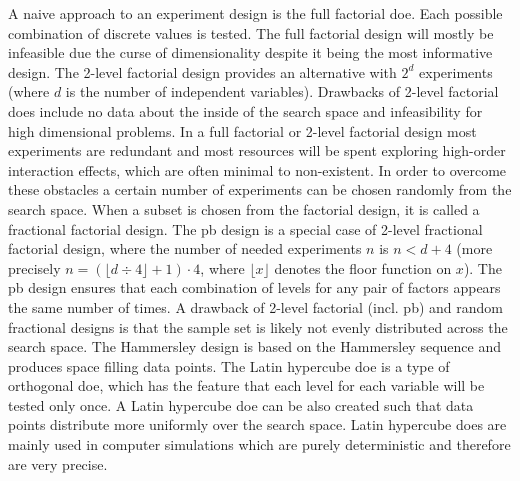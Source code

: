 A naive approach to an experiment design is the full factorial \gls{doe}.
Each possible combination of discrete values is tested.
The full factorial design will mostly be infeasible due the curse of dimensionality\cite{cherkassky1998learning} despite it being the most informative design.
The 2-level factorial design provides an alternative with $2^d$ experiments (where $d$ is the number of independent variables). 
Drawbacks of 2-level factorial \gls{doe}s include no data about the inside of the search space and infeasibility for high dimensional problems.
In a full factorial or 2-level factorial design most experiments are redundant and most resources will be spent exploring high-order interaction effects\cite{gunst2009fractional}, which are often minimal to non-existent.
In order to overcome these obstacles a certain number of experiments can be chosen randomly from the search space. 
When a subset is chosen from the factorial design, it is called a fractional factorial design. 
The \gls{pb}\cite{vanaja2007design,miller2001using,wang1995hidden} design is a special case of 2-level fractional factorial design, 
where the number of needed experiments $n$ is $n<d+4$ 
(more precisely $n=(\lfloor d\div4\rfloor+1)\cdot4$, where $\lfloor x\rfloor$ denotes the floor function on $x$).
The \gls{pb} design ensures that each combination of levels for any pair of factors appears the same number of times. 
A drawback of 2-level factorial (incl. \gls{pb}) and random fractional designs is that the sample set is likely not evenly distributed across the search space\cite{viana2016tutorial}. 
The Hammersley design\cite{viana2016tutorial,diwekar1997efficient} is based on the Hammersley sequence and produces space filling data points. 
The Latin hypercube \gls{doe}\cite{viana2016tutorial,diwekar1997efficient} is a type of orthogonal \gls{doe}, 
which has the feature that each level for each variable will be tested only once. 
A Latin hypercube \gls{doe} can be also created such that data points distribute more uniformly over the search space. 
Latin hypercube \gls{doe}s are mainly used in computer simulations which are purely deterministic and therefore are very precise.
%
\iffalse
%

